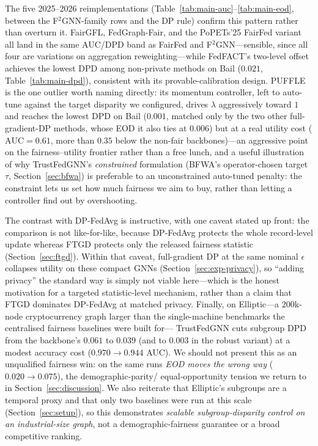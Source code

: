 \documentclass[pdflatex,sn-mathphys-num]{sn-jnl}
\theoremstyle{thmstyleone}%
\theoremstyle{thmstyletwo}%
\theoremstyle{thmstylethree}%
\begin{document}
The five 2025--2026 reimplementations (Table~\ref{tab:main-auc}--\ref{tab:main-eod},
between the F$^2$GNN-family rows and the DP rule) confirm this pattern rather
than overturn it. FairGFL, FedGraph-Fair, and the PoPETs'25 FairFed variant
all land in the same AUC/DPD band as FairFed and F$^2$GNN---sensible, since
all four are variations on aggregation reweighting---while FedFACT's two-level
offset achieves the lowest DPD among non-private methods on Bail ($0.021$,
Table~\ref{tab:main-dpd}), consistent with its provable-calibration design.
PUFFLE is the one outlier worth naming directly: its momentum controller, left
to auto-tune against the target disparity we configured, drives $\lambda$
aggressively toward $1$ and reaches the lowest DPD on Bail ($0.001$, matched
only by the two other full-gradient-DP methods, whose EOD it also ties at
$0.006$) but at a real utility cost ($\mathrm{AUC}{=}0.61$, more than
$0.35$ below the non-fair backbones)---an aggressive point on the
fairness--utility frontier rather than a free lunch, and a useful illustration
of why TrustFedGNN's \emph{constrained} formulation (BFWA's operator-chosen
target $\tau$, Section~\ref{sec:bfwa}) is preferable to an unconstrained
auto-tuned penalty: the constraint lets us set how much fairness we aim to buy,
rather than letting a controller find out by overshooting.

The contrast with DP-FedAvg is instructive, with one caveat stated up front: the
comparison is not like-for-like, because DP-FedAvg protects the whole
record-level update whereas FTGD protects only the released fairness statistic
(Section~\ref{sec:ftgd}). Within that caveat, full-gradient DP at the same
nominal $\epsilon$ collapses utility on these compact GNNs
(Section~\ref{sec:exp-privacy}), so ``adding privacy'' the standard way is simply
not viable here---which is the honest motivation for a targeted statistic-level
mechanism, rather than a claim that FTGD dominates DP-FedAvg at matched privacy.
Finally, on Elliptic---a $200$k-node cryptocurrency graph larger than the
single-machine benchmarks the centralised fairness baselines were built for---
TrustFedGNN cuts subgroup DPD from the backbone's $0.061$ to $0.039$ (and to
$0.003$ in the robust variant) at a modest accuracy cost ($0.970\to0.944$
AUC). We should not present this as an unqualified fairness win: on the same
runs \emph{EOD moves the wrong way} ($0.020\to0.075$), the demographic-parity/
equal-opportunity tension we return to in Section~\ref{sec:discussion}. We also
reiterate that Elliptic's subgroups are a temporal
proxy and that only two baselines were run at this scale
(Section~\ref{sec:setup}), so this demonstrates \emph{scalable
subgroup-disparity control on an industrial-size graph}, not a
demographic-fairness guarantee or a broad competitive ranking.
\end{document}

